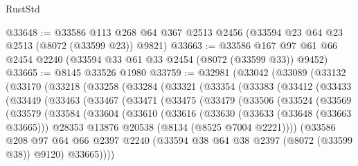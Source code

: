 \begin{lexlean}{RustStd}
\begin{coremodule}
{\begin{coremodule}
{{{{{{{{{{{{{{{{{{{{{{{{{{{{{{{{{{{{{{{{{{{{{{{{{{{{{@33648 := @33586
    @113
    @268
    @64
    @367
    @2513
    @2456
    (@33594 @23 @64 @23 @2513 (@8072 (@33599 @23)) @9821)
@33663 := @33586 @167 @97 @61 @66 @2454 @2240 (@33594 @33 @61 @33 @2454 (@8072 (@33599 @33)) @9452)
@33665 := @8145 @33526 @1980
@33759 := @32981
    (@33042
      (@33089
        (@33132
          (@33170
            (@33218
              (@33258
                (@33284
                  (@33321
                    (@33354
                      (@33383
                        (@33412
                          (@33433
                            (@33449
                              (@33463
                                (@33467
                                  (@33471
                                    (@33475
                                      (@33479
                                        (@33506
                                          (@33524
                                            (@33569
                                              (@33579
                                                (@33584
                                                  (@33604
                                                    (@33610
                                                      (@33616
                                                        (@33630
                                                          (@33633 (@33648 (@33663 @33665)))
                                                          @28353
                                                          @13876
                                                          @20538
                                                          (@8134 (@8525 @7004 @2221))))
                                                      (@33586
                                                        @208
                                                        @97
                                                        @64
                                                        @66
                                                        @2397
                                                        @2240
                                                        (@33594
                                                          @38
                                                          @64
                                                          @38
                                                          @2397
                                                          (@8072 (@33599 @38))
                                                          @9120)
                                                        @33665))))
}}}}}}}}}}}}}}}}}}}}}}}}}}}}}}}}}}}}}}}}}}}}}}}}}}}}}
\end{coremodule}}
\end{coremodule}
\end{lexlean}
